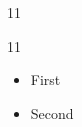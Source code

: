 \documentclass[paper=A4]{ropas-poster}
\begin{document}
\begin{postergrid}{1}{1}
\begin{posterblock}{1}{1}
\begin{itemize}\item First\item Second\end{itemize}
\end{posterblock}
\end{postergrid}
\end{document}
